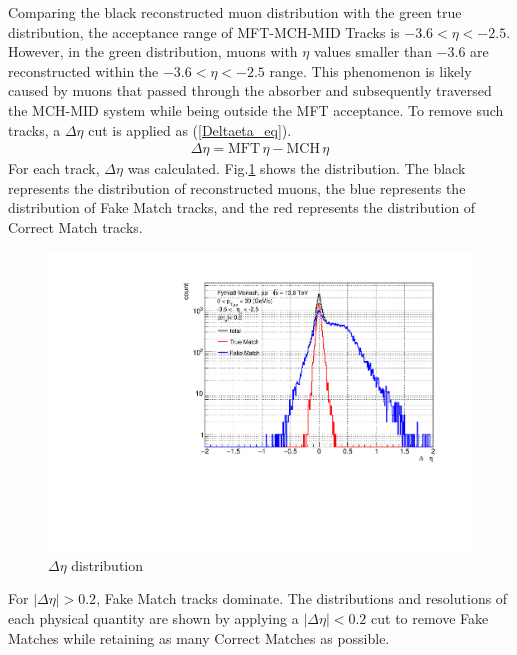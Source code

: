             Comparing the black reconstructed muon distribution with the green true distribution, the acceptance range of MFT-MCH-MID Tracks is \(-3.6 < \eta < -2.5\). However, in the green distribution, muons with \(\eta\) values smaller than \(-3.6\) are reconstructed within the \(-3.6 < \eta < -2.5\) range. This phenomenon is likely caused by muons that passed through the absorber and subsequently traversed the MCH-MID system while being outside the MFT acceptance. 
            To remove such tracks, a \(\Delta \eta\) cut is applied as (\ref{Deltaeta_eq}).
            \begin{eqnarray}
                \label{Deltaeta_eq}
                \Delta \eta = \text{MFT} \, \eta - \text{MCH} \, \eta  
            \end{eqnarray}
            For each track, \(\Delta \eta\) was calculated. Fig.\ref{Analysis:Matching:DeltaEta} shows the distribution. The black represents the distribution of reconstructed muons, the blue represents the distribution of Fake Match tracks, and the red represents the distribution of Correct Match tracks.
            \begin{figure}[H]
                \centering
                \includegraphics[keepaspectratio, scale=0.5]{fig/3_5_6_etacutno_deltaeta.pdf} %
                \caption{$\Delta \eta$ distribution}
                \label{Analysis:Matching:DeltaEta}
            \end{figure}
            For \( |\Delta \eta| > 0.2 \), Fake Match tracks dominate. The distributions and resolutions of each physical quantity are shown by applying a \( |\Delta \eta| < 0.2 \) cut to remove Fake Matches while retaining as many Correct Matches as possible.
